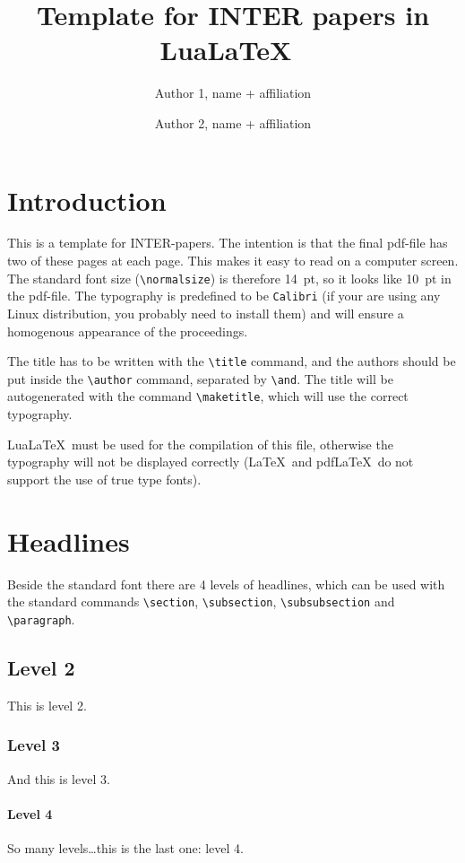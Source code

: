\documentclass[unicode-math,microtype]{interarticle}
\title{Template for INTER papers in Lua\LaTeX\ }
\author{%
  Author 1, name + affiliation \and %
  Author 2, name + affiliation %
}
\newcommand\comm[1]{\texttt{\textbackslash #1}}
\begin{document}
\maketitle


\section{Introduction}
This is a template for INTER-papers.
The intention is that the final pdf-file has two of these pages at each page.
This makes it easy to read on a computer screen.
The standard font size (\comm{normalsize}) is therefore \SI{14}{pt}, so it looks like \SI{10}{pt} in the pdf-file.
The typography is predefined to be \texttt{Calibri} (if your are using any Linux distribution, you probably need to install them) and will ensure a homogenous appearance of the proceedings.\par

The title has to be written with the \comm{title} command, and the authors should be put inside the \comm{author} command, separated by \comm{and}.
The title will be autogenerated with the command \comm{maketitle}, which will use the correct typography.\par

Lua\LaTeX\ must be used for the compilation of this file, otherwise the typography will not be displayed correctly (\LaTeX\ and pdf\LaTeX\ do not support the use of true type fonts).\par

\section{Headlines}
Beside the standard font there are 4 levels of headlines, which can be used with the standard commands \comm{section}, \comm{subsection}, \comm{subsubsection} and \comm{paragraph}.

\subsection{Level 2}
This is level 2.

\subsubsection{Level 3}
And this is level 3.

\paragraph{Level 4}
So many levels\ldots this is the last one: level 4.
\end{document}
